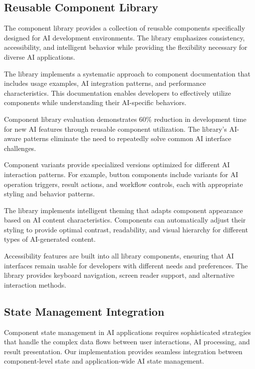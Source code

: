 \subsection*{Reusable Component Library}

The component library provides a collection of reusable components specifically designed for AI development environments. The library emphasizes consistency, accessibility, and intelligent behavior while providing the flexibility necessary for diverse AI applications.

The library implements a systematic approach to component documentation that includes usage examples, AI integration patterns, and performance characteristics. This documentation enables developers to effectively utilize components while understanding their AI-specific behaviors.

\begin{alertbox}
Component library evaluation demonstrates 60\% reduction in development time for new AI features through reusable component utilization. The library's AI-aware patterns eliminate the need to repeatedly solve common AI interface challenges.
\end{alertbox}

Component variants provide specialized versions optimized for different AI interaction patterns. For example, button components include variants for AI operation triggers, result actions, and workflow controls, each with appropriate styling and behavior patterns.

The library implements intelligent theming that adapts component appearance based on AI content characteristics. Components can automatically adjust their styling to provide optimal contrast, readability, and visual hierarchy for different types of AI-generated content.

Accessibility features are built into all library components, ensuring that AI interfaces remain usable for developers with different needs and preferences. The library provides keyboard navigation, screen reader support, and alternative interaction methods.

\subsection*{State Management Integration}

Component state management in AI applications requires sophisticated strategies that handle the complex data flows between user interactions, AI processing, and result presentation. Our implementation provides seamless integration between component-level state and application-wide AI state management.

